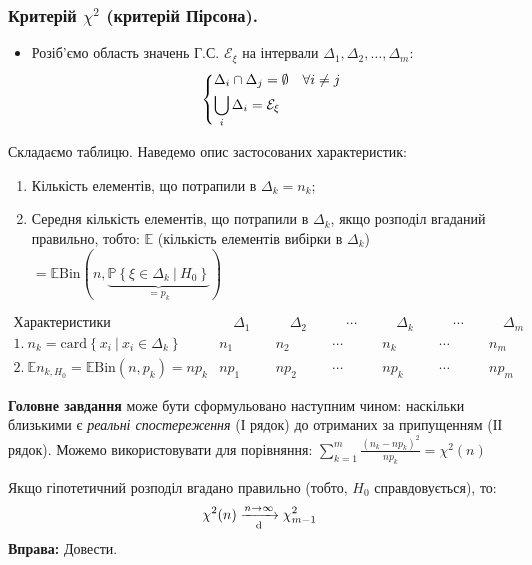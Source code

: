 \subsubsection{Критерій \(\chi^2\) (критерій Пірсона).}
\begin{itemize}
  \item Розіб'ємо область значень Г.С. \( \mathcal{E}_\xi \) на інтервали $\Delta_1, \Delta_2, \dots, \Delta_m:$
  \[
   \begin{dcases}
    \Delta_i \cap \Delta_j = \emptyset \quad \forall i \neq j \\
    \bigcup_i \Delta_i =  \mathcal{E}_\xi
   \end{dcases}
  \]
\end{itemize}
Складаємо таблицю. Наведемо опис застосованих характеристик:
\begin{enumerate}
  \item Кількість елементів, що потрапили в $\Delta_k = n_k$;
  \item Середня кількість елементів, що потрапили в $\Delta_k$, якщо розподіл вгаданий правильно, тобто:
  \( \mathbb{E} \) (кількість елементів вибірки в \( \Delta_k \)) \(  = \mathbb{E} \mathrm{Bin}(n, \underbrace{\mathbb{P} \left\lbrace \xi \in \Delta_k \  \big| \  H_0 \right\rbrace}_{= p_k}) \)
\end{enumerate}
\[
 \begin{array}{l|c|c|c|c|c|c}
\text{Характеристики}   & \quad \Delta_1 \quad & \quad \Delta_2 \quad & \quad \cdots \quad & \quad \Delta_k \quad &\quad  \cdots \quad &\quad  \Delta_m \quad \\
\hline
1.\ n_k = \mathrm{card} \left\lbrace x_i \  \big| \   x_i \in \Delta_k \right\rbrace& n_1 &n_2 & \cdots & n_k& \cdots & n_m\\
\hline
2.\ \mathbb{E} n_{k, H_0}  = \mathbb{E} \mathrm{Bin}(n, p_k) = np_k
& np_1 &np_2 & \cdots & np_k& \cdots & np_m
 \end{array}
\]

\textbf{Головне завдання} може бути сформульовано наступним чином: наскільки близькими є \textit{реальні спостереження} (І рядок) до отриманих за припущенням (ІІ рядок).
Можемо використовувати для порівняння: \(  \sum\limits_{k=1}^{m}{ \frac{(n_k - np_k)^2}{np_k}} = \chi^2(n)\)
\begin{boxteo}
 Якщо гіпотетичний розподіл вгадано правильно (тобто, \( H_0 \) справдовується), то:
 $$
 \chi^2 (n) \xrightarrow[\mathrm{d}]{n \to \infty} \chi^2_{m-1}
 $$
 \textbf{Вправа:} Довести.
\end{boxteo}
